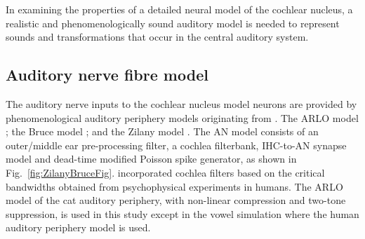 



%

In examining the properties of a detailed neural model of the cochlear nucleus,
a realistic and phenomenologically sound auditory model is needed to represent
sounds and transformations that occur in the central auditory system.

%
\subsection{Auditory nerve fibre model \label{sec:CN:resp-audit-models}}

The auditory nerve inputs to the cochlear nucleus model neurons are provided by phenomenological auditory periphery models originating from \citet{Carney:1993}.
The ARLO model \citep{HeinzZhangEtAl:2001}; the Bruce model \citep{BruceSachsEtAl:2003, ZilanyBruce:2006, ZilanyBruce:2007}; and the Zilany model \citep{ZilanyBruceEtAl:2009}.
The AN model consists of an outer\slash middle ear pre-processing filter, a cochlea filterbank, IHC-to-AN synapse model and dead-time modified Poisson spike generator, as shown in Fig.~\ref{fig:ZilanyBruceFig}.
\citet{HeinzZhangEtAl:2001} incorporated cochlea filters based on the critical bandwidths obtained from psychophysical experiments in humans.
The ARLO model of the cat auditory periphery, with non-linear compression and two-tone suppression, is used in this study except in the vowel simulation where the human auditory periphery model is used.



